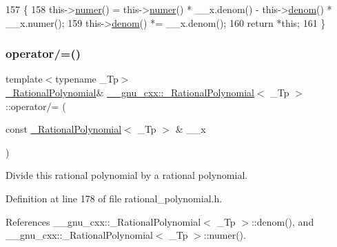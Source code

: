 \begin{DoxyCode}
157       \{
158         this->\hyperlink{class____gnu__cxx_1_1__RationalPolynomial_aa42ac2f6c2368cae05ba3a3cebf0fa24}{numer}() = this->\hyperlink{class____gnu__cxx_1_1__RationalPolynomial_aa42ac2f6c2368cae05ba3a3cebf0fa24}{numer}() * \_\_x.denom() - this->\hyperlink{class____gnu__cxx_1_1__RationalPolynomial_a05e84913ccfddcf6fcbfe623cb56c937}{denom}() * \_\_x.numer();
159         this->\hyperlink{class____gnu__cxx_1_1__RationalPolynomial_a05e84913ccfddcf6fcbfe623cb56c937}{denom}() *= \_\_x.denom();
160         \textcolor{keywordflow}{return} *\textcolor{keyword}{this};
161       \}
\end{DoxyCode}
\mbox{\label{class____gnu__cxx_1_1__RationalPolynomial_aa730392e9487843aad01fb28328ce032}} 
\subsubsection{\texorpdfstring{operator/=()}{operator/=()}}
{\footnotesize\ttfamily template$<$typename \+\_\+\+Tp$>$ \\
\hyperlink{class____gnu__cxx_1_1__RationalPolynomial}{\+\_\+\+Rational\+Polynomial}\& \hyperlink{class____gnu__cxx_1_1__RationalPolynomial}{\+\_\+\+\_\+gnu\+\_\+cxx\+::\+\_\+\+Rational\+Polynomial}$<$ \+\_\+\+Tp $>$\+::operator/= (\begin{DoxyParamCaption}\item[{const \hyperlink{class____gnu__cxx_1_1__RationalPolynomial}{\+\_\+\+Rational\+Polynomial}$<$ \+\_\+\+Tp $>$ \&}]{\+\_\+\+\_\+x }\end{DoxyParamCaption})\hspace{0.3cm}{\ttfamily [inline]}}

Divide this rational polynomial by a rational polynomial. 

Definition at line 178 of file rational\+\_\+polynomial.\+h.



References \+\_\+\+\_\+gnu\+\_\+cxx\+::\+\_\+\+Rational\+Polynomial$<$ \+\_\+\+Tp $>$\+::denom(), and \+\_\+\+\_\+gnu\+\_\+cxx\+::\+\_\+\+Rational\+Polynomial$<$ \+\_\+\+Tp $>$\+::numer().


